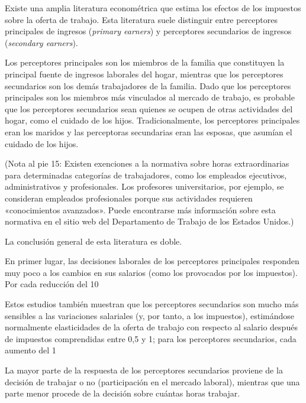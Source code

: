 \documentclass[10pt,a4paper]{article}
\begin{document}
Existe una amplia literatura econométrica que estima los efectos de los impuestos sobre la oferta de trabajo. Esta literatura suele distinguir entre perceptores principales de ingresos (\textit{primary earners}) y perceptores secundarios de ingresos (\textit{secondary earners}).

Los perceptores principales son los miembros de la familia que constituyen la principal fuente de ingresos laborales del hogar, mientras que los perceptores secundarios son los demás trabajadores de la familia. Dado que los perceptores principales son los miembros más vinculados al mercado de trabajo, es probable que los perceptores secundarios sean quienes se ocupen de otras actividades del hogar, como el cuidado de los hijos. Tradicionalmente, los perceptores principales eran los maridos y las perceptoras secundarias eran las esposas, que asumían el cuidado de los hijos.

(Nota al pie 15: Existen exenciones a la normativa sobre horas extraordinarias para determinadas categorías de trabajadores, como los empleados ejecutivos, administrativos y profesionales. Los profesores universitarios, por ejemplo, se consideran empleados profesionales porque sus actividades requieren «conocimientos avanzados». Puede encontrarse más información sobre esta normativa en el sitio web del Departamento de Trabajo de los Estados Unidos.)

La conclusión general de esta literatura es doble.

En primer lugar, las decisiones laborales de los perceptores principales responden muy poco a los cambios en sus salarios (como los provocados por los impuestos). Por cada reducción del 10 %

Estos estudios también muestran que los perceptores secundarios son mucho más sensibles a las variaciones salariales (y, por tanto, a los impuestos), estimándose normalmente elasticidades de la oferta de trabajo con respecto al salario después de impuestos comprendidas entre 0,5 y 1; para los perceptores secundarios, cada aumento del 1 %

La mayor parte de la respuesta de los perceptores secundarios proviene de la decisión de trabajar o no (participación en el mercado laboral), mientras que una parte menor procede de la decisión sobre cuántas horas trabajar.
\end{document}
